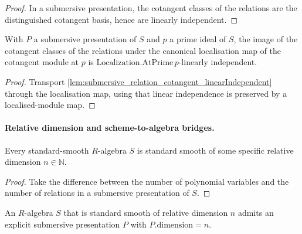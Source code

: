 \begin{proof}
  In a submersive presentation, the cotangent classes of the relations
  are the distinguished cotangent basis, hence are linearly independent.
\end{proof}

\begin{lemma}
  \label{lem:submersive_relation_cotangent_linearIndependent_localized}
  With \(P\) a submersive presentation of \(S\) and \(p\) a prime ideal of \(S\), the
  image of the cotangent classes of the relations under the canonical localisation map
  of the cotangent module at \(p\) is \(\mathrm{Localization.AtPrime}\,p\)-linearly
  independent.
\end{lemma}

\begin{proof}
  Transport
  \cref{lem:submersive_relation_cotangent_linearIndependent} through the localisation
  map, using that linear independence is preserved by a localised-module map.
\end{proof}

\paragraph{Relative dimension and scheme-to-algebra bridges.}

\begin{lemma}\leanok
  \label{lem:exists_standardSmoothOfRelativeDimension_of_standardSmooth}
  Every standard-smooth \(R\)-algebra \(S\) is standard smooth of some specific
  relative dimension \(n \in \mathbb N\).
\end{lemma}

\begin{proof}
  Take the difference between the number of polynomial variables and
  the number of relations in a submersive presentation of \(S\).
\end{proof}

\begin{lemma}\leanok
  \label{lem:exists_submersivePresentation_of_standardSmoothReldim}
  An \(R\)-algebra \(S\) that is standard smooth of relative dimension \(n\) admits an
  explicit submersive presentation \(P\) with \(P.\mathrm{dimension} = n\).
\end{lemma}

